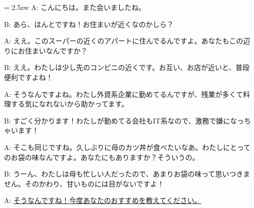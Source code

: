 \documentclass[11pt]{amsart}
\title{}
\author{}
\newenvironment{hangall}[1]{\hangindent = 2.5zw\everypar{\hangindent = 2.5zw}}{}
\begin{document}
\maketitle
\begin{hangall}{}%
A: こんにちは。また会いましたね。

B: あら、ほんとですね！お住まいが近くなのかしら？

A: ええ。このスーパーの近くのアパートに住んでるんですよ。あなたもこの辺りにお住まいなんですか？

B: ええ。わたしは少し先のコンビニの近くです。お互い、お店が近いと、普段便利ですよね！

A: そうなんですよね。わたし外資系企業に勤めてるんですが、残業が多くて料理する気になれないから助かってます。

B: すごく分かります！わたしが勤めてる会社もIT系なので、激務で嫌になっちゃいます！

A: そこも同じですね。久しぶりに母のカツ丼が食べたいなあ。わたしにとってのお袋の味なんですよ。あなたにもありますか？そういうの。

B: うーん、わたしは母も忙しい人だったので、あまりお袋の味って思いつきません。そのかわり、甘いものには目がないですよ！

A: \ul{そうなんですね！今度あなたのおすすめを教えてください。}\end{hangall}
\end{document}
